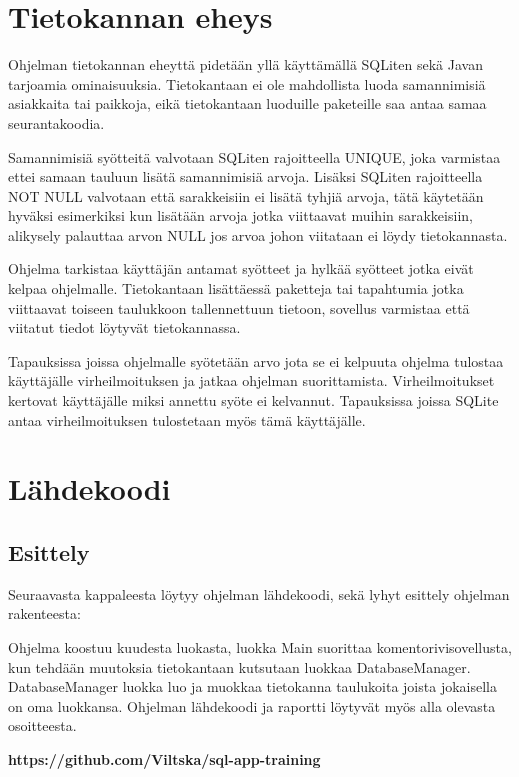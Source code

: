 \documentclass[11pt,a4paper]{article}
\begin{document}
\newpage
\section{Tietokannan eheys}
Ohjelman tietokannan eheyttä pidetään yllä käyttämällä SQLiten sekä Javan tarjoamia ominaisuuksia. Tietokantaan ei ole mahdollista luoda samannimisiä asiakkaita tai paikkoja, eikä tietokantaan luoduille paketeille saa antaa samaa seurantakoodia.

Samannimisiä syötteitä valvotaan SQLiten rajoitteella UNIQUE, joka varmistaa ettei samaan tauluun lisätä samannimisiä arvoja. Lisäksi SQLiten rajoitteella NOT NULL valvotaan että sarakkeisiin ei lisätä tyhjiä arvoja, tätä käytetään hyväksi esimerkiksi kun lisätään arvoja jotka viittaavat muihin sarakkeisiin, alikysely palauttaa arvon NULL jos arvoa johon viitataan ei löydy tietokannasta.
 
Ohjelma tarkistaa käyttäjän antamat syötteet ja hylkää syötteet jotka eivät kelpaa ohjelmalle. Tietokantaan lisättäessä paketteja tai tapahtumia jotka viittaavat toiseen taulukkoon tallennettuun tietoon, sovellus varmistaa että viitatut tiedot löytyvät tietokannassa.

Tapauksissa joissa ohjelmalle syötetään arvo jota se ei kelpuuta ohjelma tulostaa käyttäjälle virheilmoituksen ja jatkaa ohjelman suorittamista. Virheilmoitukset kertovat käyttäjälle miksi annettu syöte ei kelvannut. Tapauksissa joissa SQLite antaa virheilmoituksen tulostetaan myös tämä käyttäjälle. 

\newpage
\section{Lähdekoodi}

\subsection*{Esittely}
Seuraavasta kappaleesta löytyy ohjelman lähdekoodi, sekä lyhyt esittely ohjelman rakenteesta:

Ohjelma koostuu kuudesta luokasta, luokka Main suorittaa komentorivisovellusta, kun tehdään muutoksia tietokantaan kutsutaan luokkaa DatabaseManager. DatabaseManager luokka luo ja muokkaa tietokanna taulukoita joista jokaisella on oma luokkansa. Ohjelman lähdekoodi ja raportti löytyvät myös alla olevasta osoitteesta.

\begin{center}
\textbf{https://github.com/Viltska/sql-app-training}
\end{center}
\newpage
\end{document}
